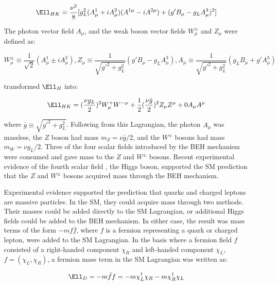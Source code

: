 \begin{equation}
	\Ell_{HK} = \frac{\nu^{2}}{8}[g^{2}_{L}(A^{1}_{\mu} + iA^{2}_{\mu})(A^{1\mu} - iA^{2\mu}) + (g'B_{\mu} - g_{L}A^{3}_{\mu})^{2}]
\end{equation}

The photon vector field $A_{\mu}$, and the weak boson vector fields $W^{\pm}_{\mu}$ and $Z_{\mu}$ were defined as:

\begin{equation}
	W^{\pm}_{\mu} \equiv \frac{1}{\sqrt{2}}(A^{1}_{\mu} \pm iA^{2}_{\mu}), 
	Z_{\mu} \equiv \frac{1}{\sqrt{g'^{2} + g^{2}_{L}}}(g'B_{\mu} - g_{L}A^{3}_{\mu}), 
	A_{\mu} \equiv \frac{1}{\sqrt{g'^{2} + g^{2}_{L}}}(g_{L}B_{\mu} + g'A^{3}_{\mu})
\end{equation}

transformed $\Ell_{H}$ into:

\begin{equation}
	\Ell_{HK} = (\frac{\nu g_{L}}{2})^{2}W^{+}_{\mu}W^{-\mu} + \frac{1}{2}(\frac{\nu \bar{g}}{2})^{2}Z_{\mu}Z^{\mu} + 0A_{\mu}A^{\mu}
\end{equation}

where $\bar{g} \equiv \sqrt{g'^{2} + g^{2}_{L}}$.  Following from this Lagrangian, the photon $A_{\mu}$ was massless, 
the $Z$ boson had mass $m_{Z} = \nu\bar{g}/2$, and the $W^{\pm}$ bosons had mass $m_{W} = \nu g_{L}/2$.  
Three of the four scalar fields introduced by the BEH mechanism were consumed and gave mass to the $Z$ 
and $W^{\pm}$ bosons.  Recent experimental evidence of the fourth scalar field \cite{combinedHiggsResult}, the Higgs boson, 
supported the SM prediction that the $Z$ and $W^{\pm}$ bosons acquired mass through the BEH mechanism.

Experimental evidence supported the prediction that quarks and charged leptons are massive particles.  In the SM, they could acquire mass 
through two methods.  Their masses could be added directly to the SM Lagrangian, or additional Higgs fields 
could be added to the BEH mechanism.  In either case, the result was mass terms of the form $-mf\bar{f}$, where $f$ is a fermion 
representing a quark or charged lepton, were added to the SM Lagrangian.  In the basis where a 
fermion field $f$ consisted of a right-handed component $\chi_{R}$ and left-handed 
component $\chi_{L}$, $f = (\chi_{L},\chi_{R})$, a fermion mass term in the SM Lagrangian was written as:

\begin{equation}
	\Ell_{D} = -m\bar{f}f = -m\chi^{\dagger}_{L}\chi_{R} - m\chi^{\dagger}_{R}\chi_{L}
\end{equation}

